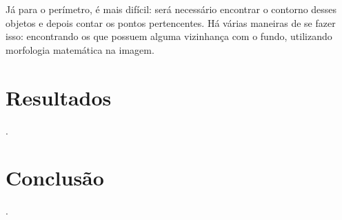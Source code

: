 \documentclass[brazilian,a4paper,twocolumn]{article}
\begin{document}
        Já para o perímetro, é mais difícil: será necessário encontrar o contorno desses objetos e depois contar os pontos pertencentes. Há várias maneiras de se fazer isso: encontrando os que possuem alguma vizinhança com o fundo, utilizando morfologia matemática na imagem.

\section{Resultados}

    .


\section{Conclusão}

    .
\end{document}
